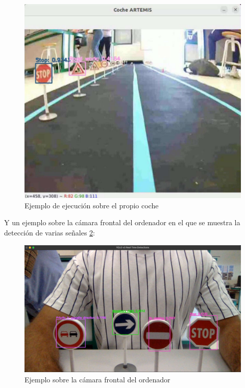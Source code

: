 \begin{figure}[H]
	\centering
	\includegraphics[width=\textwidth]{Imagenes/AnexoI_Manual/AA/YoloCNN_coche.pdf}
	\caption{Ejemplo de ejecución sobre el propio coche}
	\label{yolocoche}
\end{figure}

Y un ejemplo sobre la cámara frontal del ordenador en el que se muestra la detección de varias señales \ref{yolocamara}:

\begin{figure}[H]
	\centering
	\includegraphics[width=\textwidth]{Imagenes/AnexoI_Manual/AA/YoloCNN_camara.pdf}
	\caption{Ejemplo sobre la cámara frontal del ordenador}
	\label{yolocamara}
\end{figure}

